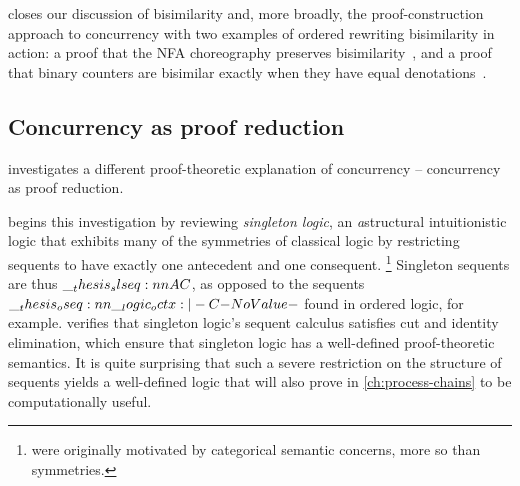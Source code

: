  closes our discussion of bisimilarity and, more broadly, the proof-construction approach to concurrency with two examples of ordered rewriting bisimilarity in action: a proof that the \acs*{NFA} choreography preserves bisimilarity~, and a proof that binary counters are bisimilar exactly when they have equal denotations~.






\subsection{Concurrency as proof reduction}

 investigates a different proof-theoretic explanation of concurrency -- concurrency as proof reduction.

 begins this investigation by reviewing \emph{singleton logic}\autocites{Santocanale:FOSSACS02}{Fortier+Santocanale:CSL13}, an \emph{a}struc\-tural intuitionistic logic that exhibits many of the symmetries of classical logic by restricting sequents to have exactly one antecedent and one consequent.%
\footnote{ were originally motivated by categorical semantic concerns, more so than symmetries.}
Singleton sequents are thus $\slseq{A |- C}$, as opposed to the sequents $\oseq{\octx |- C}$ found in ordered logic, for example.
 verifies that singleton logic's sequent calculus satisfies cut and identity elimination, which ensure that singleton logic has a well-defined proof-theoretic semantics.
It is quite surprising that such a severe restriction on the structure of sequents yields a well-defined logic that will also prove in \cref{ch:process-chains} to be computationally useful.

